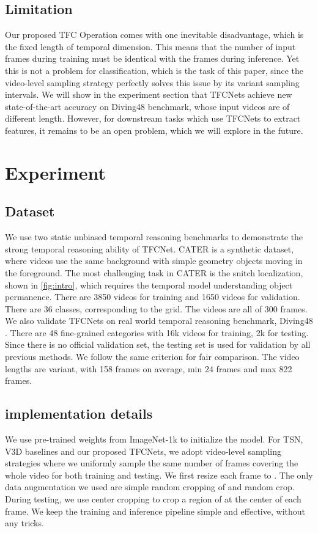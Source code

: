 \documentclass[nohyperref]{article}
\theoremstyle{plain}
\theoremstyle{definition}
\theoremstyle{remark}
\begin{document}
{{\subsection{Limitation}
Our proposed TFC Operation comes with one inevitable disadvantage, which is the fixed length of temporal dimension. This means that the number of input frames during training must be identical with the frames during inference. Yet this is not a problem for classification, which is the task of this paper, since the video-level sampling strategy perfectly solves this issue by its variant sampling intervals. We will show in the experiment section that TFCNets achieve new state-of-the-art accuracy on Diving48 benchmark, whose input videos are of different length. However, for downstream tasks which use TFCNets to extract features, it remains to be an open problem, which we will explore in the future.
\section{Experiment}
\subsection{Dataset}
We use two static unbiased temporal reasoning benchmarks to demonstrate the strong temporal reasoning ability of TFCNet. CATER \cite{Girdhar2020CATER:} is a synthetic dataset, where videos use the same background with simple geometry objects moving  in the foreground. The most challenging task in CATER is the snitch localization, shown in \cref{fig:intro}, which requires the temporal model understanding object permanence. There are 3850 videos for training and 1650 videos for validation. There are 36 classes, corresponding to the  grid. The videos are all of 300 frames.  We also validate TFCNets on real world temporal reasoning benchmark, Diving48 \cite{Li_2018_ECCV}. There are 48 fine-grained categories with 16k videos for training, 2k for testing. Since there is no official validation set, the testing set is used for validation by all previous methods. We follow the same criterion for fair comparison. The video lengths are variant, with 158 frames on average,  min 24 frames and max 822 frames.

\subsection{implementation details}
We use pre-trained weights from ImageNet-1k \cite{DBLP:conf/cvpr/DengDSLL009} to initialize the model.
For  TSN, V3D baselines and our proposed TFCNets, we adopt video-level sampling strategies where we uniformly sample the same number of frames covering the whole video for both training and testing. We first resize each frame to . The only data augmentation we used are simple random cropping  of  and random crop. 
During testing, we use center cropping to crop a region of  at the center of each frame. We keep the training and inference pipeline simple and effective, without any tricks.


}}
\end{document}

